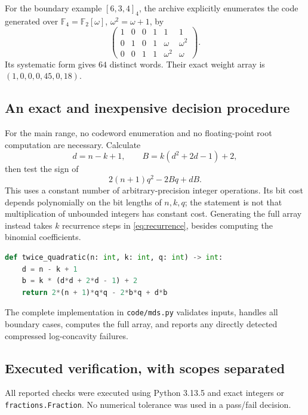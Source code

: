 \documentclass[11pt,letterpaper]{article}
\numberwithin{equation}{section}
\theoremstyle{definition}
\newcommand{\F}{\mathbb F}
\begin{document}
For the boundary example $[6,3,4]_4$, the archive explicitly
enumerates the code generated over $\F_4=\F_2[\omega]$,
$\omega^2=\omega+1$, by
\[
 \begin{pmatrix}
 1&0&0&1&1&1\\
 0&1&0&1&\omega&\omega^2\\
 0&0&1&1&\omega^2&\omega
 \end{pmatrix}.
\]
Its systematic form gives $64$ distinct words. Their exact
weight array is $(1,0,0,0,45,0,18)$.

\subsection{An exact and inexpensive decision procedure}
For the main range, no codeword enumeration and no floating-point
root computation are necessary. Calculate
\[
 d=n-k+1,\qquad B=k(d^2+2d-1)+2,
\]
then test the sign of
\begin{equation}\label{eq:integer-test}
 2(n+1)q^2-2Bq+dB.
\end{equation}
This uses a constant number of arbitrary-precision integer
operations. Its bit cost depends polynomially on the bit lengths of
$n,k,q$; the statement is not that multiplication of unbounded
integers has constant cost. Generating the full array instead takes
$k$ recurrence steps in \eqref{eq:recurrence}, besides computing the
binomial coefficients.

\begin{lstlisting}[language=Python]
def twice_quadratic(n: int, k: int, q: int) -> int:
    d = n - k + 1
    b = k * (d*d + 2*d - 1) + 2
    return 2*(n + 1)*q*q - 2*b*q + d*b
\end{lstlisting}
The complete implementation in \texttt{code/mds.py} validates inputs,
handles all boundary cases, computes the full array, and reports
any directly detected compressed log-concavity failures.

\subsection{Executed verification, with scopes separated}
All reported checks were executed using Python 3.13.5 and exact
integers or \texttt{fractions.Fraction}. No numerical tolerance
was used in a pass/fail decision.
\end{document}
